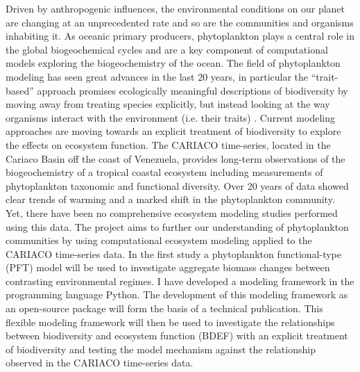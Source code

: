 \begin{titlepage}
Driven by anthropogenic influences, the environmental conditions on our planet are changing at an unprecedented rate and so are the communities and organisms inhabiting it. As oceanic primary producers, phytoplankton plays a central role in the global biogeochemical cycles and are a key component of computational models exploring the biogeochemistry of the ocean. 
The field of phytoplankton modeling has seen great advances in the last 20 years, in particular the “trait-based” approach 
promises  %
ecologically meaningful descriptions of biodiversity by moving away from treating species explicitly, but instead looking at the way organisms interact with the environment 
(i.e. their traits) %
. Current modeling approaches are moving towards an explicit treatment of biodiversity to explore the effects on ecosystem function. The CARIACO time-series, located in the Cariaco Basin off the coast of Venezuela, provides long-term observations of the biogeochemistry of a tropical coastal ecosystem including measurements of phytoplankton taxonomic and functional diversity. Over  20 years of data showed clear trends of warming and a marked shift in the phytoplankton community. 
Yet, there have been no comprehensive ecosystem modeling studies performed using this data. The project aims to further our understanding of phytoplankton communities by using computational ecosystem modeling applied to the CARIACO time-series data. In the first study a phytoplankton functional-type (PFT) model will be used to investigate aggregate biomass changes between contrasting environmental regimes. 
I have developed a modeling framework in the programming language Python. The development of this modeling framework as an open-source package will form the basis of a technical publication. 
This flexible modeling framework will then be used to investigate the relationships between biodiversity and ecosystem function (BDEF) with an explicit treatment of biodiversity and testing the model mechanism against the relationship observed in the CARIACO time-series data. 



  

\end{titlepage}